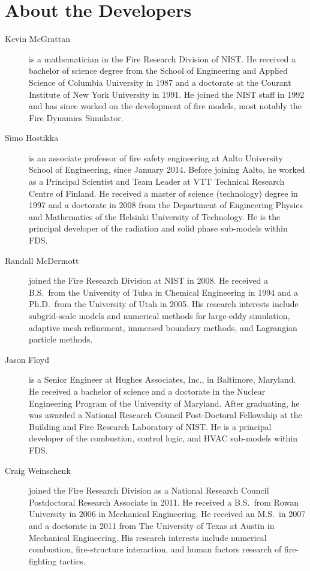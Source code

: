 \chapter{About the Developers}

\begin{description}

\item[Kevin McGrattan] is a mathematician in the Fire Research Division of NIST. He received a bachelor of science degree from the School of Engineering and Applied Science of Columbia University in 1987 and a doctorate at the Courant Institute of New York University in 1991. He joined the NIST staff in 1992 and has since worked on the development of fire models, most notably the Fire Dynamics Simulator.

\item[Simo Hostikka] is an associate professor of fire safety engineering at Aalto University School of Engineering, since January 2014. Before joining Aalto, he worked as a Principal Scientist and Team Leader at VTT Technical Research Centre of Finland. He received a master of science (technology) degree in 1997 and a doctorate in 2008 from the Department of Engineering Physics and Mathematics of the Helsinki University of Technology.  He is the principal developer of the radiation and solid phase sub-models within FDS.

\item[Randall McDermott] joined the Fire Research Division at NIST in 2008. He received a B.S.~from the University of Tulsa in Chemical Engineering in 1994 and a Ph.D.~from the University of Utah in 2005. His research interests include subgrid-scale models and numerical methods for large-eddy simulation, adaptive mesh refinement, immersed boundary methods, and Lagrangian particle methods.

\item[Jason Floyd] is a Senior Engineer at Hughes Associates, Inc., in Baltimore, Maryland. He received a bachelor of science and a doctorate in the Nuclear Engineering Program of the University of Maryland. After graduating, he was awarded a National Research Council Post-Doctoral Fellowship at the Building and Fire Research Laboratory of NIST. He is a principal developer of the combustion, control logic, and HVAC sub-models within FDS.

\item[Craig Weinschenk] joined the Fire Research Division as a National Research Council Postdoctoral Research Associate in 2011. He received a B.S.~from Rowan University in 2006 in Mechanical Engineering. He received an M.S.~in 2007 and a doctorate in 2011 from The University of Texas at Austin in Mechanical Engineering. His research interests include numerical combustion, fire-structure interaction, and human factors research of fire-fighting tactics.


\end{description}
